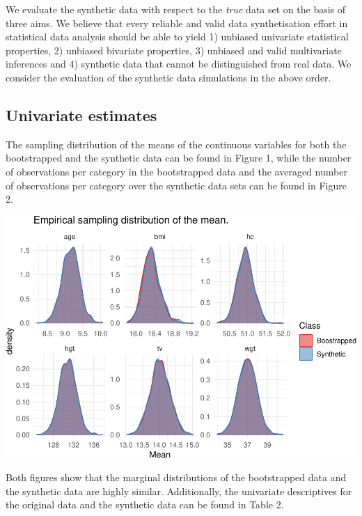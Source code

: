 \documentclass[psych,article,submit,moreauthors,pdftex]{mdpi}
\begin{document}
We evaluate the synthetic data with respect to the \emph{true} data set
on the basis of three aims. We believe that every reliable and valid
data synthetisation effort in statistical data analysis should be able
to yield 1) unbiased univariate statistical properties, 2) unbiased
bivariate properties, 3) unbiased and valid multivariate inferences and
4) synthetic data that cannot be distinguished from real data. We
consider the evaluation of the synthetic data simulations in the above
order.

\hypertarget{univariate-estimates}{%
\subsection{Univariate estimates}\label{univariate-estimates}}

The sampling distribution of the means of the continuous variables for
both the bootstrapped and the synthetic data can be found in Figure 1,
while the number of observations per category in the bootstrapped data
and the averaged number of observations per category over the synthetic
data sets can be found in Figure 2.

\includegraphics{Manuscript_files/figure-latex/univariate-statistics-1.pdf}

Both figures show that the marginal distributions of the bootstrapped
data and the synthetic data are highly similar. Additionally, the
univariate descriptives for the original data and the synthetic data can
be found in Table 2.
\end{document}
